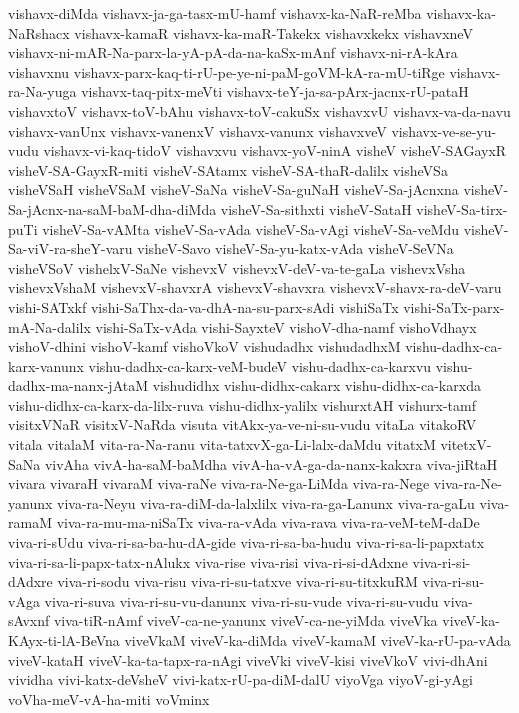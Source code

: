{vishavx-diMda
vishavx-ja-ga-tasx-mU-hamf
vishavx-ka-NaR-reMba
vishavx-ka-NaRshacx
vishavx-kamaR
vishavx-ka-maR-Takekx
vishavxkekx
vishavxneV
vishavx-ni-mAR-Na-parx-la-yA-pA-da-na-kaSx-mAnf
vishavx-ni-rA-kAra
vishavxnu
vishavx-parx-kaq-ti-rU-pe-ye-ni-paM-goVM-kA-ra-mU-tiRge
vishavx-ra-Na-yuga
vishavx-taq-pitx-meVti
vishavx-teY-ja-sa-pArx-jacnx-rU-pataH
vishavxtoV
vishavx-toV-bAhu
vishavx-toV-cakuSx
vishavxvU
vishavx-va-da-navu
vishavx-vanUnx
vishavx-vanenxV
vishavx-vanunx
vishavxveV
vishavx-ve-se-yu-vudu
vishavx-vi-kaq-tidoV
vishavxvu
vishavx-yoV-ninA
visheV
visheV-SAGayxR
visheV-SA-GayxR-miti
visheV-SAtamx
visheV-SA-thaR-dalilx
visheVSa
visheVSaH
visheVSaM
visheV-SaNa
visheV-Sa-guNaH
visheV-Sa-jAcnxna
visheV-Sa-jAcnx-na-saM-baM-dha-diMda
visheV-Sa-sithxti
visheV-SataH
visheV-Sa-tirx-puTi
visheV-Sa-vAMta
visheV-Sa-vAda
visheV-Sa-vAgi
visheV-Sa-veMdu
visheV-Sa-viV-ra-sheY-varu
visheV-Savo
visheV-Sa-yu-katx-vAda
visheV-SeVNa
visheVSoV
vishelxV-SaNe
vishevxV
vishevxV-deV-va-te-gaLa
vishevxVsha
vishevxVshaM
vishevxV-shavxrA
vishevxV-shavxra
vishevxV-shavx-ra-deV-varu
vishi-SATxkf
vishi-SaThx-da-va-dhA-na-su-parx-sAdi
vishiSaTx
vishi-SaTx-parx-mA-Na-dalilx
vishi-SaTx-vAda
vishi-SayxteV
vishoV-dha-namf
vishoVdhayx
vishoV-dhini
vishoV-kamf
vishoVkoV
vishudadhx
vishudadhxM
vishu-dadhx-ca-karx-vanunx
vishu-dadhx-ca-karx-veM-budeV
vishu-dadhx-ca-karxvu
vishu-dadhx-ma-nanx-jAtaM
vishudidhx
vishu-didhx-cakarx
vishu-didhx-ca-karxda
vishu-didhx-ca-karx-da-lilx-ruva
vishu-didhx-yalilx
vishurxtAH
vishurx-tamf
visitxVNaR
visitxV-NaRda
visuta
vitAkx-ya-ve-ni-su-vudu
vitaLa
vitakoRV
vitala
vitalaM
vita-ra-Na-ranu
vita-tatxvX-ga-Li-lalx-daMdu
vitatxM
vitetxV-SaNa
vivAha
vivA-ha-saM-baMdha
vivA-ha-vA-ga-da-nanx-kakxra
viva-jiRtaH
vivara
vivaraH
vivaraM
viva-raNe
viva-ra-Ne-ga-LiMda
viva-ra-Nege
viva-ra-Ne-yanunx
viva-ra-Neyu
viva-ra-diM-da-lalxlilx
viva-ra-ga-Lanunx
viva-ra-gaLu
viva-ramaM
viva-ra-mu-ma-niSaTx
viva-ra-vAda
viva-rava
viva-ra-veM-teM-daDe
viva-ri-sUdu
viva-ri-sa-ba-hu-dA-gide
viva-ri-sa-ba-hudu
viva-ri-sa-li-papxtatx
viva-ri-sa-li-papx-tatx-nAlukx
viva-rise
viva-risi
viva-ri-si-dAdxne
viva-ri-si-dAdxre
viva-ri-sodu
viva-risu
viva-ri-su-tatxve
viva-ri-su-titxkuRM
viva-ri-su-vAga
viva-ri-suva
viva-ri-su-vu-danunx
viva-ri-su-vude
viva-ri-su-vudu
viva-sAvxnf
viva-tiR-nAmf
viveV-ca-ne-yanunx
viveV-ca-ne-yiMda
viveVka
viveV-ka-KAyx-ti-lA-BeVna
viveVkaM
viveV-ka-diMda
viveV-kamaM
viveV-ka-rU-pa-vAda
viveV-kataH
viveV-ka-ta-tapx-ra-nAgi
viveVki
viveV-kisi
viveVkoV
vivi-dhAni
vividha
vivi-katx-deVsheV
vivi-katx-rU-pa-diM-dalU
viyoVga
viyoV-gi-yAgi
voVha-meV-vA-ha-miti
voVminx
}
